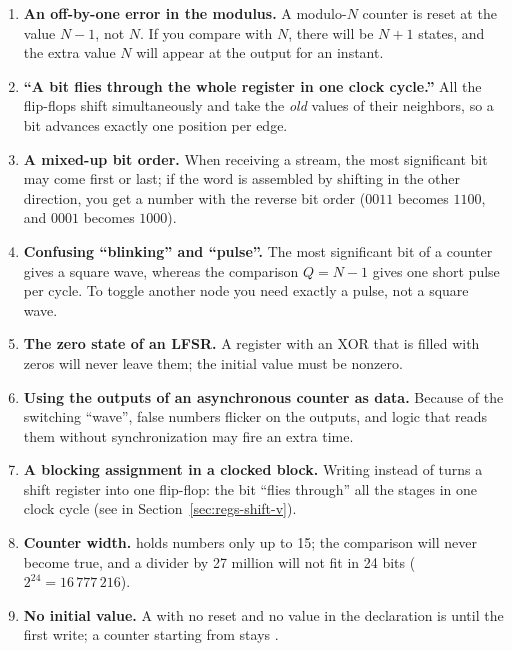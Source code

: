 \begin{warnbox}
\begin{enumerate}
  \item \textbf{An off-by-one error in the modulus.} A modulo-$N$ counter is reset
        at the value $N-1$, not $N$. If you compare with $N$, there will be
        $N+1$ states, and the extra value $N$ will appear at the output for an
        instant.
  \item \textbf{``A bit flies through the whole register in one clock cycle.''} All the flip-flops
        shift simultaneously and take the \emph{old} values of their neighbors, so
        a bit advances exactly one position per edge.
  \item \textbf{A mixed-up bit order.} When receiving a stream, the most significant bit
        may come first or last; if the word is assembled by shifting in the
        other direction, you get a number with the reverse bit order
        ($0011$ becomes $1100$, and $0001$ becomes $1000$).
  \item \textbf{Confusing ``blinking'' and ``pulse''.} The most significant bit of a counter
        gives a square wave, whereas the comparison $Q=N-1$ gives one short pulse per cycle.
        To toggle another node you need exactly a pulse, not a square wave.
  \item \textbf{The zero state of an LFSR.} A register with an XOR that is filled
        with zeros will never leave them; the initial value must be
        nonzero.
  \item \textbf{Using the outputs of an asynchronous counter as data.}
        Because of the switching ``wave'', false numbers flicker on the outputs, and logic
        that reads them without synchronization may fire an extra time.
  \item \textbf{A blocking assignment in a clocked block.} Writing
         instead of \code{<=} turns a shift register into
        one flip-flop: the bit ``flies through'' all the stages in one clock cycle
        (see  in Section~\ref{sec:regs-shift-v}).
  \item \textbf{Counter width.}  holds numbers only up to 15;
        the comparison  will never become true, and a divider by
        27 million will not fit in 24 bits ($2^{24}=16\,777\,216$).
  \item \textbf{No initial value.} A  with no reset and no value in the
        declaration is  until the first write; a counter starting from
         stays .
\end{enumerate}
\end{warnbox}

